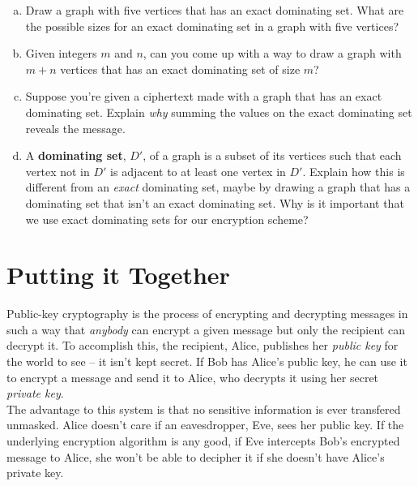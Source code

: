 \documentclass[12pt]{article}
\begin{document}
\begin{enumerate}[(a)]
	\item Draw a graph with five vertices that has an exact dominating set. What are the possible sizes for an exact dominating set in a graph with five vertices?

	\item Given integers $m$ and $n$, can you come up with a way to draw a graph with $m+n$ vertices that has an exact dominating set of size $m$?

	\vspace{3cm}

	\item Suppose you're given a ciphertext made with a graph that has an exact dominating set. Explain \textit{why} summing the values on the exact dominating set reveals the message.

	\vspace{3cm}

	\item A \textbf{dominating set}, $D'$, of a graph is a subset of its vertices such that each vertex not in $D'$ is adjacent to at least one vertex in $D'$. Explain how this is different from an \textit{exact} dominating set, maybe by drawing a graph that has a dominating set that isn't an exact dominating set. Why is it important that we use exact dominating sets for our encryption scheme?

	\vspace{3cm}
\end{enumerate}

\section*{Putting it Together}
Public-key cryptography is the process of encrypting and decrypting messages in such a way that \textit{anybody} can encrypt a given message but only the recipient can decrypt it. To accomplish this, the recipient, Alice, publishes her \textit{public key} for the world to see -- it isn't kept secret. If Bob has Alice's public key, he can use it to encrypt a message and send it to Alice, who decrypts it using her secret \textit{private key}.\\

\noindent The advantage to this system is that no sensitive information is ever transfered unmasked. Alice doesn't care if an eavesdropper, Eve, sees her public key. If the underlying encryption algorithm is any good, if Eve intercepts Bob's encrypted message to Alice, she won't be able to decipher it if she doesn't have Alice's private key.
\end{document}
